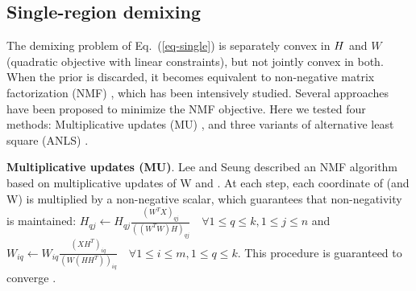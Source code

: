 \documentclass{article} %
\newcommand{\W}{W}
\renewcommand{\eqref}[1]{Eq.~(\ref{#1})}
\begin{document}

\subsection{Single-region demixing}
The demixing problem of \eqref{eq-single} is separately convex in ${H}$ and $\W$ (quadratic objective with linear constraints), but not jointly convex in both. When the prior is discarded, it becomes equivalent to non-negative matrix factorization (NMF) \cite{leenmfs}, which has been intensively studied. Several approaches have been proposed to minimize the NMF objective.
%
Here we tested four methods: Multiplicative updates (MU) \cite{leenmfs}, and three variants of alternative least square (ANLS) \cite{lin2007projected,kim2008activeset,kim2011fast}. 

{\bf {Multiplicative updates (MU)}}. Lee and Seung \cite{leenmfs} described an NMF algorithm based on multiplicative updates of W and \Htext. At each step, each coordinate of \Htext (and \W) is multiplied by a non-negative scalar, which guarantees that non-negativity is maintained: $H_{qj} \leftarrow H_{qj} \frac{(W^TX)_{qj}}{((W^TW)H)_{qj}} \quad
\forall 1\leq q \leq k, 1\leq j \leq n$ and $W_{iq} \leftarrow W_{iq} \frac{(XH^T)_{iq}}{(W(HH^T))_{iq}} \quad \forall 1\leq i \leq m, 1\leq q \leq k$.
This procedure is guaranteed to converge \cite{leenmfs,lin2007convergence}. 
\end{document}
